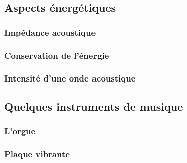 \subsection{Aspects énergétiques}
\subsubsection{Impédance acoustique}
\subsubsection{Conservation de l'énergie}
\subsubsection{Intensité d'une onde acoustique}

\subsection{Quelques instruments de musique}
\subsubsection{L'orgue}
\subsubsection{Plaque vibrante}


\newpage